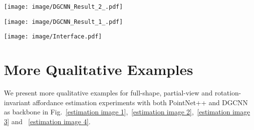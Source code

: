 \documentclass[final]{cvpr}
\begin{document}
\begin{figure*}[t]
   \begin{center}
      \texttt{[image: image/DGCNN\_Result\_2\_.pdf]}
   \end{center}
   \vspace{-0.5cm}
   \caption{Qualitative results for affordance estimation from DGCNN(1/2). The top row shows the ground truth. The second row shows the full-shape estimated results, the third row shows the partial-view estimated result, the fourth and the bottom row show the  and  rotation-invariant estimated results, respectively. All results come from DGCNN. The top words indicate the semantic category of each column and the bottom words indicate the affordance category. The greener the color of the points, the higher the confidence about specific affordance types. \textit{Wrap.} is the abbreviation of \textit{Wrap-Grasp.}}
   \label{estimation image 3}
\end{figure*}

\begin{figure*}[t]
   \begin{center}
      \texttt{[image: image/DGCNN\_Result\_1\_.pdf]}
   \end{center}
   \caption{Qualitative results for affordance estimation from DGCNN(2/2). The top row shows the ground truth. The second row shows the full-shape estimated results, the third row shows the partial-view estimated result, the fourth and the bottom row show the  and  rotation-invariant estimated results, respectively. All results come from DGCNN. The top words indicate the semantic category of each column and the bottom words indicate the affordance category. The greener the color of the points, the higher the confidence about specific affordance types. \textit{Wrap.} is the abbreviation of \textit{Wrap-Grasp.}}
   \label{estimation image 4}
\end{figure*}

\begin{figure*}[t]
   \begin{center}
      \texttt{[image: image/Interface.pdf]}
   \end{center}
   \caption{The annotation interface of our web-based annotation tool. We show the GUI and main component of the annotation interface.}
   \label{annotation interface}
\end{figure*}

\section{More Qualitative Examples} \label{qualitative examples}
We present more qualitative examples for full-shape, partial-view and rotation-invariant affordance estimation experiments with both PointNet++ and DGCNN as backbone in Fig.~\ref{estimation image 1},~\ref{estimation image 2},~\ref{estimation image 3} and ~\ref{estimation image 4}.
\end{document}
